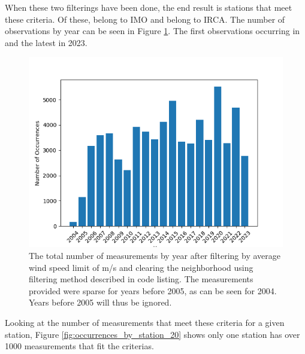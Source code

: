 When these two filterings have been done, the end result is \nStationsMin stations that meet these criteria. Of these, \nVedurMin belong to IMO and \nVGMin belong to IRCA. The number of observations by year can be seen in Figure \ref{fig:occurrences_by_year}. The first observations occurring in \startDateVedur and the latest in 2023.

\begin{figure}
    \begin{center}
        \includegraphics[scale = 0.75]{Figures/occurrences_by_year.png}
    \end{center}
    \caption[Measurements that fit filtering by year (from \startDateVedur to 2023).]{The total number of measurements by year after filtering by average wind speed limit of \averageWindSpeedLimit m/s and clearing the neighborhood using filtering method described in code listing. The measurements provided were sparse for years before 2005, as can be seen for 2004. Years before 2005 will thus be ignored.}
    \label{fig:occurrences_by_year}
\end{figure}

Looking at the number of measurements that meet these criteria for a given station, Figure \ref{fig:occurrences_by_station_20} shows only one station has over 1000 measurements that fit the criterias.

